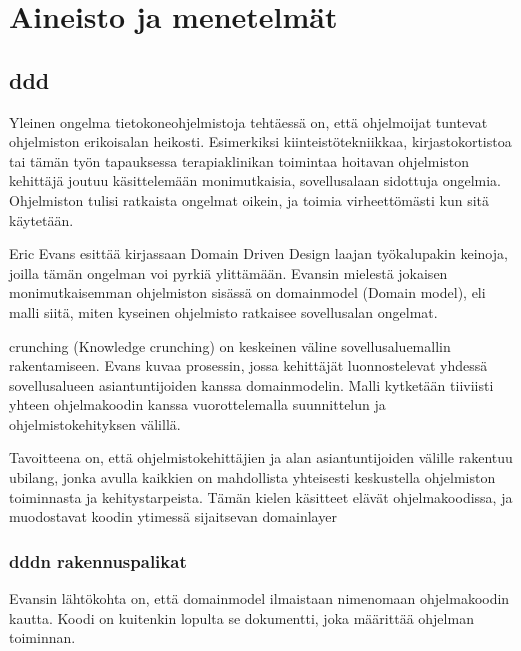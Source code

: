 \hypertarget{aineisto-ja-menetelmuxe4t}{%
\chapter{Aineisto ja menetelmät}\label{aineisto-ja-menetelmuxe4t}}

\hypertarget{section}{%
\section{\texorpdfstring{\gls{ddd}}{}}\label{section}}

Yleinen ongelma tietokoneohjelmistoja tehtäessä on, että ohjelmoijat
tuntevat ohjelmiston erikoisalan heikosti. Esimerkiksi
kiinteistötekniikkaa, kirjastokortistoa tai tämän työn tapauksessa
terapiaklinikan toimintaa hoitavan ohjelmiston kehittäjä joutuu
käsittelemään monimutkaisia, sovellusalaan sidottuja ongelmia.
Ohjelmiston tulisi ratkaista ongelmat oikein, ja toimia virheettömästi
kun sitä käytetään.

Eric Evans esittää kirjassaan Domain Driven Design laajan työkalupakin
keinoja, joilla tämän ongelman voi pyrkiä ylittämään. Evansin mielestä
jokaisen monimutkaisemman ohjelmiston sisässä on \gls{domainmodel}
(Domain model), eli malli siitä, miten kyseinen ohjelmisto ratkaisee
sovellusalan ongelmat.

\Gls{crunching} (Knowledge crunching) on keskeinen väline
sovellusaluemallin rakentamiseen. Evans kuvaa prosessin, jossa
kehittäjät luonnostelevat yhdessä sovellusalueen asiantuntijoiden kanssa
\gls{domainmodel}in. Malli kytketään tiiviisti yhteen ohjelmakoodin
kanssa vuorottelemalla suunnittelun ja ohjelmistokehityksen välillä.
\cite[s. 13]{evans:ddd}

Tavoitteena on, että ohjelmistokehittäjien ja alan asiantuntijoiden
välille rakentuu \gls{ubilang}, jonka avulla kaikkien on mahdollista
yhteisesti keskustella ohjelmiston toiminnasta ja kehitystarpeista.
Tämän kielen käsitteet elävät ohjelmakoodissa, ja muodostavat koodin
ytimessä sijaitsevan \gls{domainlayer}

\hypertarget{n-rakennuspalikat}{%
\subsection{\texorpdfstring{\gls{ddd}n
rakennuspalikat}{n rakennuspalikat}}\label{n-rakennuspalikat}}

Evansin lähtökohta on, että \gls{domainmodel} ilmaistaan nimenomaan
ohjelmakoodin kautta. Koodi on kuitenkin lopulta se dokumentti, joka
määrittää ohjelman toiminnan.

